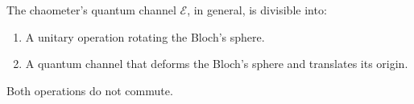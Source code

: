 \documentclass[10pt,letterpaper]{article}
\newcommand{\mcE}{\mathcal E}
\begin{document}
The chaometer's quantum channel $\mcE$, in general, is divisible into: 
\begin{enumerate}
\item A unitary operation rotating the Bloch's sphere.
\item A quantum channel that deforms the Bloch's sphere and translates its origin.
\end{enumerate}
Both operations do not commute. 



\end{document}
